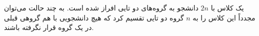 \EXERCISE
 یک کلاس با 
$2n$
  دانشجو به گروه‌های دو تایی افراز شده است. به چند حالت می‌توان مجدداً این کلاس را به 
$n$
   گروه دو تایی تقسیم کرد که هیچ دانشجویی با هم گروهی قبلی در یک گروه قرار نگرفته باشند.